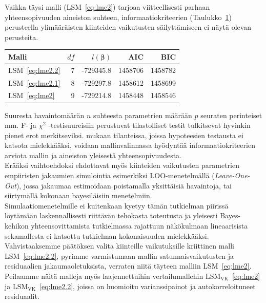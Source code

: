 \documentclass[finnish]{docopts}
\begin{document}
Vaikka täysi malli (LSM~\ref{eq:lme2}) tarjoaa viitteellisesti parhaan yhteensopivuuden aineiston suhteen, informaatiokriteerien (Taulukko~\ref{table:kriit1}) perusteella ylimääräisten kiinteiden vaikutusten säilyttämiseen ei näytä olevan perusteita.\\

\begin{table}[H]
\centering
\begin{tabular}{lrrrr}
\toprule
Malli & $df$ & $l(\bm{\beta})$ & AIC & BIC\\
\midrule
LSM~\ref{eq:lme2.2} & 7 & -729345.8 & 1458706 & 1458782\\
LSM~\ref{eq:lme2.1} & 8 & -729297.8 & 1458612 & 1458699\\
LSM~\ref{eq:lme2} & 9 & -729214.8 & 1458448 & 1458546\\
\bottomrule
\end{tabular}
\label{table:kriit1}
\end{table}

Suuresta havaintomäärän $n$ suhteesta parametrien määrään $p$ seuraten perinteiset mm. F- ja $\chi^2$ -testisuureisiin perustuvat tilastolliset testit tulkitsevat hyvinkin pienet erot merkitseviksi. \cite{burzykowski13} mukaan tilanteissa, joissa hypoteesien testausta ei katsota mielekkääksi, voidaan mallinvalinnassa hyödyntää informaatiokriteerien arviota mallin ja aineiston yleisestä yhteensopivuudesta.\\ 

Erääksi vaihtoehdoksi \cite{burzykowski13} ehdottavat myös kiinteiden vaikutusten parametrien empiiristen jakaumien simulointia esimerkiksi LOO-menetelmällä (\textit{Leave-One-Out}), jossa jakaumaa estimoidaan poistamalla yksittäisiä havaintoja, tai siirtymällä kokonaan bayesiläisiin menetelmiin.\\

Simulaatiomenetelmille ei kuitenkaan kyetyy tämän tutkielman piirissä löytämään laskennallisesti riittävän tehokasta toteutusta ja yleisesti Bayes-kehikon yhteensovittamista tutkielmassa rajattuun näkökulmaan lineaarisista sekamallesta ei katsottu tutkielman kokonaisuuden mielekkääksi.\\ 

Vahvistaaksemme päätöksen valita kiinteille vaikutuksille kriittinen malli LSM~\ref{eq:lme2.2}, pyrimme varmistumaan mallin satunnaisvaikutusten ja residuaalien jakaumaoletuksista, verraten niitä täyteen malliin LSM~\ref{eq:lme2}. Peilaamme näitä malleja myös laajennettuihin vertailumallehin $\text{LSM}_{\text{VK}}$~\ref{eq:lme2} ja $\text{LSM}_{\text{VK}}$~\ref{eq:lme2.2}, joissa on huomioitu varianssipainot ja autokorreloituneet residuaalit.\\
\end{document}
